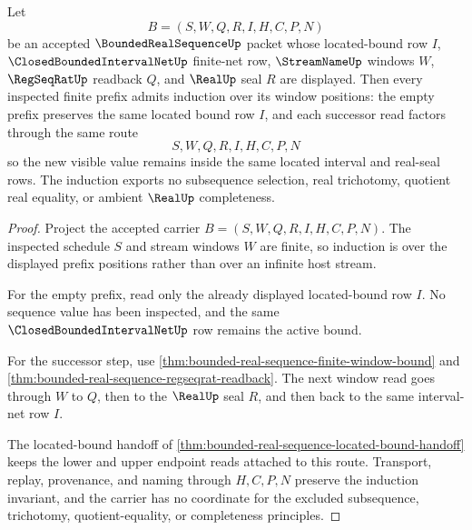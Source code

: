 \begin{theorem}
\label{thm:bounded-real-sequence-location-induction}
Let
$$
B=(S,W,Q,R,I,H,C,P,N)
$$
be an accepted $\BoundedRealSequenceUp$ packet whose located-bound row $I$, $\ClosedBoundedIntervalNetUp$ finite-net row, $\StreamNameUp$ windows $W$, $\RegSeqRatUp$ readback $Q$, and $\RealUp$ seal $R$ are displayed. Then every inspected finite prefix admits induction over its window positions: the empty prefix preserves the same located bound row $I$, and each successor read factors through the same route
$$
S,W,Q,R,I,H,C,P,N
$$
so the new visible value remains inside the same located interval and real-seal rows. The induction exports no subsequence selection, real trichotomy, quotient real equality, or ambient $\RealUp$ completeness.
\end{theorem}
\begin{proof}
Project the accepted carrier $B=(S,W,Q,R,I,H,C,P,N)$. The inspected schedule $S$ and stream windows $W$ are finite, so induction is over the displayed prefix positions rather than over an infinite host stream.

For the empty prefix, read only the already displayed located-bound row $I$. No sequence value has been inspected, and the same $\ClosedBoundedIntervalNetUp$ row remains the active bound.

For the successor step, use \autoref{thm:bounded-real-sequence-finite-window-bound} and \autoref{thm:bounded-real-sequence-regseqrat-readback}. The next window read goes through $W$ to $Q$, then to the $\RealUp$ seal $R$, and then back to the same interval-net row $I$.

The located-bound handoff of \autoref{thm:bounded-real-sequence-located-bound-handoff} keeps the lower and upper endpoint reads attached to this route. Transport, replay, provenance, and naming through $H,C,P,N$ preserve the induction invariant, and the carrier has no coordinate for the excluded subsequence, trichotomy, quotient-equality, or completeness principles.
\end{proof}

